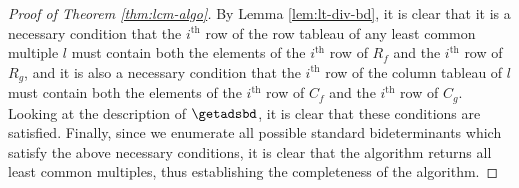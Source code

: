 \documentclass[11pt,reqno]{amsart}
\theoremstyle{definition}
\numberwithin{equation}{section}
\begin{document}
\begin{proof}[Proof of Theorem \ref{thm:lcm-algo}]
By Lemma \ref{lem:lt-div-bd}, it is clear that it is a necessary condition that the $i^{\text{th}}$ row of the row tableau of any least common multiple $l$ must contain both the elements of the $i^{\text{th}}$ row of $R_f$ and the $i^{\text{th}}$ row of $R_g$, and it is also a necessary condition that the $i^{\text{th}}$ row of the column tableau of $l$ must contain both the elements of the $i^{\text{th}}$ row of $C_f$ and the $i^{\text{th}}$ row of $C_g$. Looking at the description of $\getadsbd$, it is clear that these conditions are satisfied. Finally, since we enumerate all possible standard bideterminants which satisfy the above necessary conditions, it is clear that the algorithm returns all least common multiples, thus establishing the completeness of the algorithm.
\end{proof}
\end{document}
